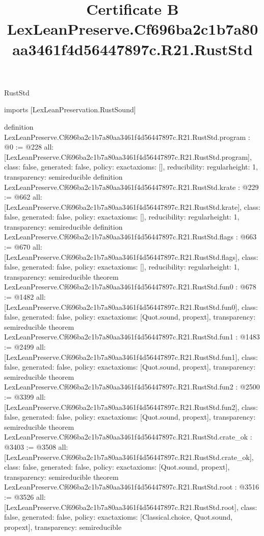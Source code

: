 \begin{lexlean}{RustStd}
\title{Certificate B LexLeanPreserve.Cf696ba2c1b7a80aa3461f4d56447897c.R21.RustStd}
\begin{coremodule}
imports [LexLeanPreservation.RustSound]

definition LexLeanPreserve.Cf696ba2c1b7a80aa3461f4d56447897c.R21.RustStd.program : @0 := @228 {
  all: [LexLeanPreserve.Cf696ba2c1b7a80aa3461f4d56447897c.R21.RustStd.program],
  class: false,
  generated: false,
  policy: exact{axioms: []},
  reducibility: regular{height: 1},
  transparency: semireducible
}
definition LexLeanPreserve.Cf696ba2c1b7a80aa3461f4d56447897c.R21.RustStd.krate : @229 := @662 {
  all: [LexLeanPreserve.Cf696ba2c1b7a80aa3461f4d56447897c.R21.RustStd.krate],
  class: false,
  generated: false,
  policy: exact{axioms: []},
  reducibility: regular{height: 1},
  transparency: semireducible
}
definition LexLeanPreserve.Cf696ba2c1b7a80aa3461f4d56447897c.R21.RustStd.flags : @663 := @670 {
  all: [LexLeanPreserve.Cf696ba2c1b7a80aa3461f4d56447897c.R21.RustStd.flags],
  class: false,
  generated: false,
  policy: exact{axioms: []},
  reducibility: regular{height: 1},
  transparency: semireducible
}
theorem LexLeanPreserve.Cf696ba2c1b7a80aa3461f4d56447897c.R21.RustStd.fun0 : @678 := @1482 {
  all: [LexLeanPreserve.Cf696ba2c1b7a80aa3461f4d56447897c.R21.RustStd.fun0],
  class: false,
  generated: false,
  policy: exact{axioms: [Quot.sound, propext]},
  transparency: semireducible
}
theorem LexLeanPreserve.Cf696ba2c1b7a80aa3461f4d56447897c.R21.RustStd.fun1 : @1483 := @2499 {
  all: [LexLeanPreserve.Cf696ba2c1b7a80aa3461f4d56447897c.R21.RustStd.fun1],
  class: false,
  generated: false,
  policy: exact{axioms: [Quot.sound, propext]},
  transparency: semireducible
}
theorem LexLeanPreserve.Cf696ba2c1b7a80aa3461f4d56447897c.R21.RustStd.fun2 : @2500 := @3399 {
  all: [LexLeanPreserve.Cf696ba2c1b7a80aa3461f4d56447897c.R21.RustStd.fun2],
  class: false,
  generated: false,
  policy: exact{axioms: [Quot.sound, propext]},
  transparency: semireducible
}
theorem LexLeanPreserve.Cf696ba2c1b7a80aa3461f4d56447897c.R21.RustStd.crate_ok : @3403 := @3508 {
  all: [LexLeanPreserve.Cf696ba2c1b7a80aa3461f4d56447897c.R21.RustStd.crate_ok],
  class: false,
  generated: false,
  policy: exact{axioms: [Quot.sound, propext]},
  transparency: semireducible
}
theorem LexLeanPreserve.Cf696ba2c1b7a80aa3461f4d56447897c.R21.RustStd.root : @3516 := @3526 {
  all: [LexLeanPreserve.Cf696ba2c1b7a80aa3461f4d56447897c.R21.RustStd.root],
  class: false,
  generated: false,
  policy: exact{axioms: [Classical.choice, Quot.sound, propext]},
  transparency: semireducible
}


\end{coremodule}
\end{lexlean}
